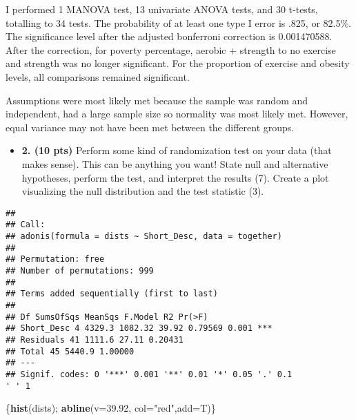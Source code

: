 \documentclass[]{article}
\newenvironment{Shaded}{\begin{snugshade}}{\end{snugshade}}
\newcommand{\DataTypeTok}[1]{\textcolor[rgb]{0.13,0.29,0.53}{#1}}
\newcommand{\FloatTok}[1]{\textcolor[rgb]{0.00,0.00,0.81}{#1}}
\newcommand{\KeywordTok}[1]{\textcolor[rgb]{0.13,0.29,0.53}{\textbf{#1}}}
\newcommand{\NormalTok}[1]{#1}
\newcommand{\OperatorTok}[1]{\textcolor[rgb]{0.81,0.36,0.00}{\textbf{#1}}}
\newcommand{\StringTok}[1]{\textcolor[rgb]{0.31,0.60,0.02}{#1}}
\providecommand{\tightlist}{%
  \setlength{\itemsep}{0pt}\setlength{\parskip}{0pt}}
\begin{document}
I performed 1 MANOVA test, 13 univariate ANOVA tests, and 30 t-tests,
totalling to 34 tests. The probability of at least one type I error is
.825, or 82.5\%. The significance level after the adjusted bonferroni
correction is 0.001470588. After the correction, for poverty percentage,
aerobic + strength to no exercise and strength was no longer
significant. For the proportion of exercise and obesity levels, all
comparisons remained significant.

Assumptions were most likely met because the sample was random and
independent, had a large sample size so normality was most likely met.
However, equal variance may not have been met between the different
groups.

\begin{itemize}
\tightlist
\item
  \textbf{2. (10 pts)} Perform some kind of randomization test on your
  data (that makes sense). This can be anything you want! State null and
  alternative hypotheses, perform the test, and interpret the results
  (7). Create a plot visualizing the null distribution and the test
  statistic (3).
\end{itemize}

\begin{Shaded}
\end{Shaded}

\begin{verbatim}
##
## Call:
## adonis(formula = dists ~ Short_Desc, data = together)
##
## Permutation: free
## Number of permutations: 999
##
## Terms added sequentially (first to last)
##
## Df SumsOfSqs MeanSqs F.Model R2 Pr(>F)
## Short_Desc 4 4329.3 1082.32 39.92 0.79569 0.001 ***
## Residuals 41 1111.6 27.11 0.20431
## Total 45 5440.9 1.00000
## ---
## Signif. codes: 0 '***' 0.001 '**' 0.01 '*' 0.05 '.' 0.1
' ' 1
\end{verbatim}

\begin{Shaded}
\begin{Highlighting}[]
\NormalTok{\{}\KeywordTok{hist}\NormalTok{(dists); }\KeywordTok{abline}\NormalTok{(}\DataTypeTok{v=}\FloatTok{39.92}\NormalTok{, }\DataTypeTok{col=}\StringTok{"red"}\NormalTok{,}\DataTypeTok{add=}\NormalTok{T)\}}
\end{Highlighting}
\end{Shaded}
\end{document}
